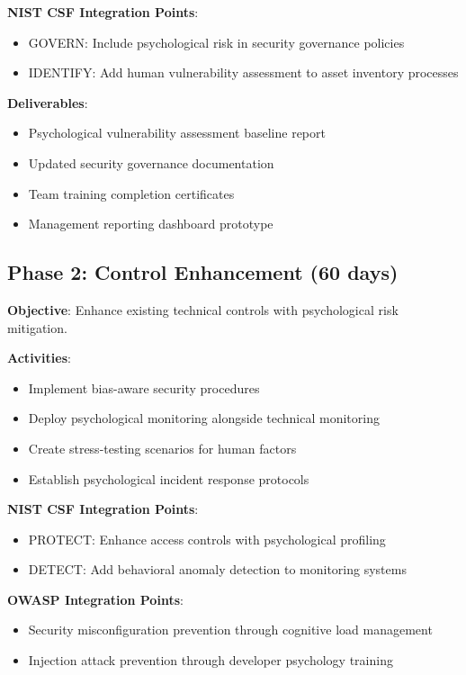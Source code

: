 \documentclass[11pt,a4paper]{article}
\begin{document}
\textbf{NIST CSF Integration Points}:
\begin{itemize}
\item GOVERN: Include psychological risk in security governance policies
\item IDENTIFY: Add human vulnerability assessment to asset inventory processes
\end{itemize}

\textbf{Deliverables}:
\begin{itemize}
\item Psychological vulnerability assessment baseline report
\item Updated security governance documentation
\item Team training completion certificates
\item Management reporting dashboard prototype
\end{itemize}

\subsection{Phase 2: Control Enhancement (60 days)}

\textbf{Objective}: Enhance existing technical controls with psychological risk mitigation.

\textbf{Activities}:
\begin{itemize}
\item Implement bias-aware security procedures
\item Deploy psychological monitoring alongside technical monitoring
\item Create stress-testing scenarios for human factors
\item Establish psychological incident response protocols
\end{itemize}

\textbf{NIST CSF Integration Points}:
\begin{itemize}
\item PROTECT: Enhance access controls with psychological profiling
\item DETECT: Add behavioral anomaly detection to monitoring systems
\end{itemize}

\textbf{OWASP Integration Points}:
\begin{itemize}
\item Security misconfiguration prevention through cognitive load management
\item Injection attack prevention through developer psychology training
\end{itemize}
\end{document}
